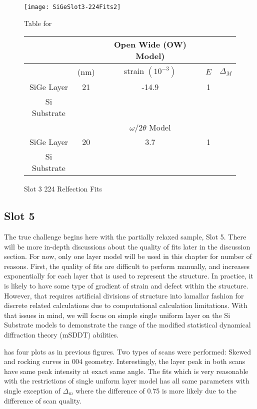 \begin{figure}[hc]%
\caption{Slot 3 224 Relfection Fits}
\label{Slot3-224}
\begin{minipage}{0.85\linewidth}
\texttt{[image: SiGeSlot3-224Fits2]}
\end{minipage}
\begin{minipage}{\linewidth}
\centering
\vspace{10pt}
Table for \\
\vspace{5pt}
\begin{tabular}{c|cccc}
\hline
			& 	&Open Wide (OW) Model)	 \\
\hline
			&	(nm)	&	strain	 $(10^{-3})$&	$E$ &  $\Delta_M$\\
\hline
SiGe Layer		&  	21	&     -14.9	 & 1 &\textendash	\\
Si Substrate		&	\textemdash & \textemdash&\textemdash\ &\textemdash	\\
\hline
			& &$\omega/2\theta$ Model \\
\hline
SiGe Layer		&	20	&3.7	&1	&\textendash\ 	\\
Si Substrate		&	\textemdash & \textemdash&\textemdash\ &\textemdash
\end{tabular}
\end{minipage}
\end{figure}

\subsection{Slot 5}

The true challenge begins here with the partially relaxed sample, Slot 5.  There will be more in-depth discussions about the quality of fits later in the discussion section.  For now, only one layer model will be used in this chapter for number of reasons.  First, the quality of fits are difficult to perform manually, and increases exponentially for each layer that is used to represent the structure.  In practice, it is likely to have some type of gradient of strain and defect within the structure.  However, that requires artificial divisions of structure into lamallar fashion for discrete related calculations due to computational calculation limitations.  With that issues in mind, we will focus on simple single uniform layer on the Si Substrate models to demonstrate the range of the modified statistical dynamical diffraction theory (mSDDT) abilities.

 has four plots as in previous figures.  Two types of scans were performed:  Skewed and rocking curves in 004 geometry.  Interestingly, the layer peak in both scans have same peak intensity at exact same angle.  The fits which is very reasonable with the restrictions of single uniform layer model has all same parameters with single exception of $\Delta_m$ where the difference of 0.75 is more likely due to the difference of scan quality.





